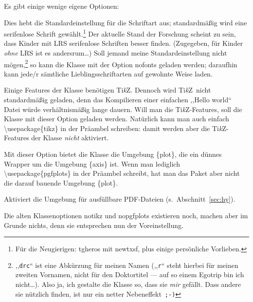 \documentclass[hyperworksheet,pgfplots]{drcschool}
\newcommand*{\cs}[1]{\textup{\ttfamily\textbackslash#1}}                   %
\newcommand*{\pkg}[1]{\textup{\ttfamily#1}}                                %
\newcommand*{\opt}[1]{\textup{\ttfamily#1}}                                %
\newcommand*{\env}[1]{\textup{\ttfamily\{#1\}}}                            %
\newcommand*{\TikZ}{\textup{Ti\textit{k}Z}}                                %
\begin{document}
Es gibt einige wenige eigene Optionen:
\begin{compactdesc}
\item[\opt{nofonts}] Dies hebt die Standardeinstellung für die
   Schriftart aus; standardmäßig wird eine serifenlose Schrift gewählt.\footnote{%
      Für die Neugierigen: \pkg{tgheros} mit \pkg{newtxsf}, plus einige persönliche Vorlieben.}
   Der aktuelle Stand der Forschung scheint zu sein, dass Kinder mit LRS serifenlose
   Schriften besser finden. (Zugegeben, für Kinder \emph{ohne} LRS ist es andersrum\ldots)
   Soll jemand meine Standardeinstellung nicht mögen,\footnote{%
      ,,\texttt{drc}`` ist eine Abkürzung für meinen Namen (,,\texttt{r}`` steht hierbei
      für meinen zweiten Vornamen, nicht für den Doktortitel --- auf so einem Egotrip bin ich nicht\ldots).
      Also ja, ich gestalte die Klasse so, dass sie \emph{mir} gefällt.
      Dass andere sie nützlich finden, ist nur ein netter Nebeneffekt~\texttt{;-)}}
   so kann die Klasse mit der Option \opt{nofonts} geladen werden; daraufhin kann jede/r
   sämtliche Lieblingsschriftarten auf gewohnte Weise laden.
\item[\opt{tikz}] Einige Features der Klasse benötigen \TikZ. Dennoch wird \TikZ\ nicht
   standardmäßig geladen, denn das Kompilieren einer einfachen ,,Hello world`` Datei würde
   verhältnismäßig lange dauern. Will man die \TikZ-Features, soll die Klasse mit
   dieser Option geladen werden. Natürlich kann man auch einfach
   \cs{usepackage\{tikz\}} in der Präambel schreiben: damit werden aber die \TikZ-Features
   der Klasse \emph{nicht} aktiviert.
\item[\opt{pgfplots}] Mit dieser Option bietet die Klasse die Umgebung \env{plot}, die ein
   dünnes Wrapper um die Umgebung \env{axis} ist.
   Wenn man lediglich \cs{usepackage\{pgfplots\}} in der Präambel schreibt, hat man das Paket
   aber nicht die darauf bauende Umgebung \env{plot}.
\item[\opt{hyperworksheet}] Aktiviert die Umgebung für ausfüllbare PDF-Dateien (s.~Abschnitt~\ref{sec:hy}).
\end{compactdesc}
Die alten Klassenoptionen \opt{notikz} und \opt{nopgfplots} existieren noch, machen aber im
Grunde nichts, denn sie entsprechen nun der Voreinstellung.
\end{document}

